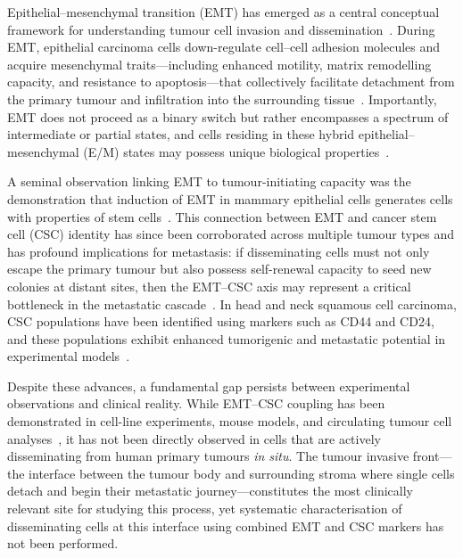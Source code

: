 \documentclass[11pt,a4paper]{article}
\begin{document}
Epithelial--mesenchymal transition (EMT) has emerged as a central conceptual framework for understanding tumour cell invasion and dissemination~\cite{thiery2009,nieto2016}. During EMT, epithelial carcinoma cells down-regulate cell--cell adhesion molecules and acquire mesenchymal traits---including enhanced motility, matrix remodelling capacity, and resistance to apoptosis---that collectively facilitate detachment from the primary tumour and infiltration into the surrounding tissue~\cite{brabletz2018,lambert2017}. Importantly, EMT does not proceed as a binary switch but rather encompasses a spectrum of intermediate or partial states, and cells residing in these hybrid epithelial--mesenchymal (E/M) states may possess unique biological properties~\cite{pastushenko2019,jolly2015}.

A seminal observation linking EMT to tumour-initiating capacity was the demonstration that induction of EMT in mammary epithelial cells generates cells with properties of stem cells~\cite{mani2008}. This connection between EMT and cancer stem cell (CSC) identity has since been corroborated across multiple tumour types and has profound implications for metastasis: if disseminating cells must not only escape the primary tumour but also possess self-renewal capacity to seed new colonies at distant sites, then the EMT--CSC axis may represent a critical bottleneck in the metastatic cascade~\cite{shibue2017,dongre2019}. In head and neck squamous cell carcinoma, CSC populations have been identified using markers such as CD44 and CD24, and these populations exhibit enhanced tumorigenic and metastatic potential in experimental models~\cite{prince2007,biddle2011}.

Despite these advances, a fundamental gap persists between experimental observations and clinical reality. While EMT--CSC coupling has been demonstrated in cell-line experiments, mouse models, and circulating tumour cell analyses~\cite{yu2013,grosse-wilde2015}, it has not been directly observed in cells that are actively disseminating from human primary tumours \textit{in situ}. The tumour invasive front---the interface between the tumour body and surrounding stroma where single cells detach and begin their metastatic journey---constitutes the most clinically relevant site for studying this process, yet systematic characterisation of disseminating cells at this interface using combined EMT and CSC markers has not been performed.
\end{document}
